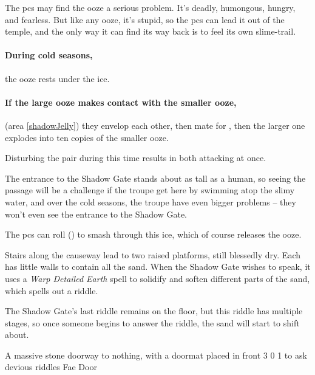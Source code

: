 
The \glspl{pc} may find the ooze a serious problem.
It's deadly, humongous, hungry, and fearless.
But like any ooze, it's stupid, so the \glspl{pc} can lead it out of the temple, and the only way it can find its way back is to feel its own slime-trail.


\paragraph{During cold seasons,}
the ooze rests under the ice.

\paragraph{If the large ooze makes contact with the smaller ooze,}
(area \vref{shadowJelly})
they envelop each other, then mate for , then the larger one explodes into ten copies of the smaller ooze.

Disturbing the pair during this time results in  both attacking at once.


The entrance to the Shadow Gate stands about as tall as a human, so seeing the passage will be a challenge if the troupe get here by swimming atop the slimy water, and over the cold seasons, the troupe have even bigger problems -- they won't even see the entrance to the Shadow Gate.

The \glspl{pc} can roll  (\tn[10]) to smash through this ice, which of course releases the ooze.

Stairs along the causeway lead to two raised platforms, still blessedly dry.
Each has little walls to contain all the sand.
When the Shadow Gate wishes to speak, it uses a \textit{Warp Detailed Earth} spell to solidify and soften different parts of the sand, which spells out a riddle.

The Shadow Gate's last riddle remains on the floor, but this riddle has multiple stages, so once someone begins to answer the riddle, the sand will start to shift about.

  {A massive stone doorway to nothing, with a doormat placed in front}%
  {3}%
  {0}%
  {1}%
  {to ask devious riddles}%
  {Fae Door}%
  {
    \setcounter{Fire}{2}
    \setcounter{Earth}{3}
    \setcounter{Water}{1}
    \setcounter{Academics}{2}
    \setcounter{Caving}{1}
    \setcounter{Xenomology}{1}
  }%

